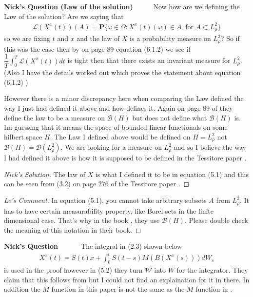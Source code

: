 \documentclass[a4paper,11pt]{article}
\theoremstyle{plain}
\theoremstyle{definition}
\newcounter{NQ}
\newenvironment{NickQuestion}[1][] %
  {\refstepcounter{NQ}
  \begin{mdframed}[backgroundcolor=lightgray]\textbf{Nick's Question \theNQ \: #1~~}~~~\noindent}%
  {\end{mdframed}}
\numberwithin{NQ}{section}
\numberwithin{LQ}{section}
\numberwithin{ZQ}{section}
\begin{document}
\begin{NickQuestion}[(Law of the solution)]
 Now how are we defining the Law of the solution? Are we saying that \begin{align} \mathscr L(X^x(t))(A)=\textbf{P}\{\omega \in \Omega : X^x(t)(\omega)\in A \;\; \text{for $A \subset L^2_\rho$} \} \end{align} so we are fixing $ t$ and $x$ and the law of $X$ is a probability measure on $L^2_\rho$? So if this was the case then by \cite{DZ96} on page 89 equation (6.1.2) we see if $\dfrac{1}{T}\int_0^T\mathscr L(X^x(t))dt$ is tight then that there exists an invariant measure for $L^2_\rho$. (Also I have the details worked out which proves the statement about equation (6.1.2) )
 
 However there is a minor discrepancy here when comparing the Law defined the way I just had defined
 it above and how \cite{DZ96} defines it. Again on page 89 of \cite{DZ96} they define the law to be
 a measure on $\mathcal B(H)$ but does not define what $\mathcal B(H)$ is. Im guessing that it means
 the space of bounded linear functionals on some hilbert space $H$. The Law I defined above would be
 defined on $H=L^2_\rho$ not $\mathcal B(H)=\mathcal B(L^2_\rho)$. We are looking for a measure on
 $L^2_\rho$ and so I believe the way I had defined it above is how it is supposed to be defined in
 the Tessitore paper \cite{TessitoreZabczyk98M}. 
\end{NickQuestion}
 
 
\begin{proof}[Nick's Solution]
The law of $X$ is what I defined it to be in equation (5.1) and this can be seen from (3.2) on page 276 of the Tessitore paper \cite{TessitoreZabczyk98M}.    
\end{proof}

\begin{proof}[Le's Comment]
In equation (5.1), you cannot take arbitrary subsets $A$ from $L_\rho^2$. It has to have certain measurability property, like Borel sets in the finite dimensional case. That's why in the book \cite{DZ96}, they use $\mathcal{B}(H)$. Please double check the meaning of this notation in their book.    
\end{proof}

\begin{NickQuestion}
     The integral in (2.3) shown below \begin{align}
         X^x(t)=S(t)x+\int_0^tS(t-s)M(B(X^x(s)))dW_s
     \end{align} is used in the proof however in (5.2) they turn $\mathscr W$ into $W$ for the integrator. They claim that this follows from \cite{PZ95} but I could not find an explaination for it in there. In addition the $M$ function in this paper \cite{TessitoreZabczyk98M} is not the same as the $M$ function in \cite{PZ95}.
  \end{NickQuestion}  
  
\end{document}
